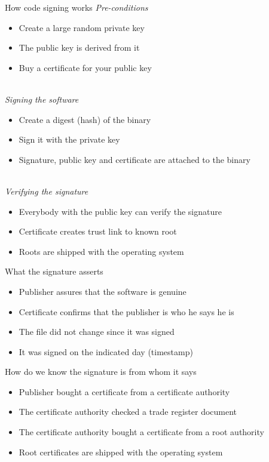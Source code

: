 \documentclass[11pt]{beamer}
\begin{document}
\begin{frame}{How code signing works}
\emph{Pre-conditions}
\begin{itemize}
\item Create a large random private key
\item The public key is derived from it
\item Buy a certificate for your public key
\end{itemize}
\pause
\\[0.2cm]
\emph{Signing the software}
\begin{itemize}
\item Create a digest (hash) of the binary
\item Sign it with the private key
\item Signature, public key and certificate are attached to the binary
\end{itemize}
\pause
\\[0.2cm]
\emph{Verifying the signature}
\begin{itemize}
\item Everybody with the public key can verify the signature
\item Certificate creates trust link to known root
\item Roots are shipped with the operating system
\end{itemize}
\end{frame}

\begin{frame}{What the signature asserts}
\begin{itemize}
\item Publisher assures that the software is genuine
\item Certificate confirms that the publisher is who he says he is
\item The file did not change since it was signed
\item It was signed on the indicated day (timestamp)
\end{itemize}
\end{frame}

\begin{frame}{How do we know the signature is from whom it says}
\begin{itemize}
\item Publisher bought a certificate from a certificate authority
\item The certificate authority checked a trade register document
\item The certificate authority bought a certificate from a root authority
\item Root certificates are shipped with the operating system
\end{itemize}
\end{frame}
\end{document}

